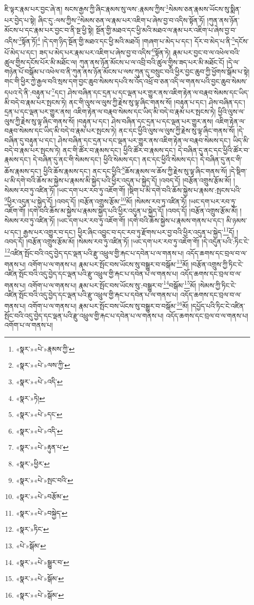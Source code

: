ཇི་ལྟར་རྣམ་པར་བྱང་ཞེ་ན། སངས་རྒྱས་ཀྱི་ཞིང་རྣམས་སུ་ལས་:རྣམས་ཀྱིས་\footnote{«སྣར་»«པེ་»རྣམས་ཀྱི་}སེམས་ཅན་རྣམས་ཡོངས་སུ་སྨིན་པར་བྱེད་པ་སྟེ། ཞིང་དུ་:ལས་ཀྱིས་\footnote{«སྣར་»«པེ་»ལས་ཀྱི་}སེམས་ཅན་ལ་རྣམ་པར་འཇིག་པ་ཞེས་བྱ་བ་འདིས་སྟོན་ཏོ། །ཀུན་ནས་ཉོན་མོངས་པ་དང་རྣམ་པར་བྱང་བ་ནི་སྔ་ཕྱི་སྟེ། སྔོན་གྱི་མཐའ་དང་ཕྱི་མའི་མཐའ་ལ་རྣམ་པར་འཇིག་པ་ཞེས་བྱ་བ་འདིས་\footnote{«སྣར་»«པེ་»འདི་}སྟོན་ཏོ།\footnote{«སྣར་»ཏེ།} །དེ་དག་ཉིད་སྔོན་གྱི་མཐའ་དང་ཕྱི་མའི་མཐའོ། །གཞག་པ་མེད་པ་དང་། དོར་བ་མེད་པ་ནི་\footnote{«སྣར་»«པེ་»དང་}དངོས་པོ་མེད་པ་དང་། ཟད་པ་མེད་པར་རྣམ་པར་འཇིག་པ་ཞེས་བྱ་བ་འདིས་\footnote{«སྣར་»«པེ་»འདི་}སྟོན་ཏེ། རྣམ་པར་བྱང་བ་ལ་འཕེལ་བའི་ཚུལ་གྱིས་དངོས་པོར་མི་མཐོང་ལ། ཀུན་ནས་ཉོན་མོངས་པ་ལ་འབྲི་བའི་ཚུལ་གྱིས་ཟད་པར་མི་མཐོང་ངོ། །དེ་ལ་གཉེན་པོ་བསྒོམ་པ་འཕེལ་བ་ནི་ཀུན་ནས་ཉོན་མོངས་པ་ལས་ཀུན་དུ་བསྲུང་བའི་ཕྱིར་བྱང་ཆུབ་ཀྱི་ཕྱོགས་སྒོམ་པ་སྟེ། གང་གི་ཕྱིར་ཀྱེ་རྒྱལ་བའི་སྲས་དག་བྱང་ཆུབ་སེམས་དཔའི་ས་འོད་འཕྲོ་བ་ཅན་འདི་ལ་གནས་པའི་བྱང་ཆུབ་སེམས་དཔའ་དེ་ནི་:བརྟུན་པ་\footnote{«སྣར་»«པེ་»རྟུན་པ་}དང་། ཤེས་བཞིན་དང་དྲན་པ་དང་ལྡན་པར་གྱུར་ནས་འཇིག་རྟེན་ལ་བརྣབ་སེམས་དང་ཡིད་མི་བདེ་བ་རྣམ་པར་སྤངས་ཏེ། ནང་གི་ལུས་ལ་ལུས་ཀྱི་རྗེས་སུ་ལྟ་ཞིང་གནས་སོ། །བརྟུན་པ་དང་། ཤེས་བཞིན་དང་། དྲན་པ་དང་ལྡན་པར་གྱུར་ནས། འཇིག་རྟེན་ལ་བརྣབ་སེམས་དང་ཡིད་མི་བདེ་བ་རྣམ་པར་སྤངས་ཏེ། ཕྱིའི་ལུས་ལ་ལུས་ཀྱི་རྗེས་སུ་ལྟ་ཞིང་གནས་སོ། །བརྟུན་པ་དང་། ཤེས་བཞིན་དང་དྲན་པ་དང་ལྡན་པར་གྱུར་ནས། འཇིག་རྟེན་ལ་བརྣབ་སེམས་དང་ཡིད་མི་བདེ་བ་རྣམ་པར་སྤངས་ཏེ། ནང་དང་ཕྱིའི་ལུས་ལ་ལུས་ཀྱི་རྗེས་སུ་ལྟ་ཞིང་གནས་སོ། །དེ་བཞིན་དུ་བརྟུན་པ་དང་། ཤེས་བཞིན་དང་དྲན་པ་དང་ལྡན་པར་གྱུར་ནས་འཇིག་རྟེན་ལ་བརྣབ་སེམས་དང་། ཡིད་མི་བདེ་བ་རྣམ་པར་སྤངས་ཏེ། ནང་གི་ཚོར་བ་རྣམས་དང་། ཕྱིའི་ཚོར་བ་རྣམས་དང་། དེ་བཞིན་དུ་ནང་དང་ཕྱིའི་ཚོར་བ་རྣམས་དང་། དེ་བཞིན་དུ་ནང་གི་སེམས་དང་། ཕྱིའི་སེམས་དང་། ནང་དང་ཕྱིའི་སེམས་དང་། དེ་བཞིན་དུ་ནང་གི་ཆོས་རྣམས་དང་། ཕྱིའི་ཆོས་རྣམས་དང་། ནང་དང་ཕྱིའི་\footnote{«སྣར་»ཕྱིར་}ཆོས་རྣམས་ལ་ཆོས་ཀྱི་རྗེས་སུ་ལྟ་ཞིང་གནས་སོ། །དེ་སྡིག་པ་མི་དགེ་བའི་ཆོས་མ་སྐྱེས་པ་རྣམས་མི་སྐྱེད་པའི་ཕྱིར་འདུན་པ་སྐྱེད་དོ། །འབད་དོ། །བརྩོན་འགྲུས་རྩོམ་མོ། །སེམས་རབ་ཏུ་འཛིན་ཏོ། །ཡང་དག་པར་རབ་ཏུ་འཇོག་གོ། །སྡིག་པ་མི་དགེ་བའི་ཆོས་སྐྱེས་པ་རྣམས་:སྤངས་པའི་\footnote{«སྣར་»«པེ་»སྤང་བའི་}ཕྱིར་འདུན་པ་སྐྱེད་དོ། །འབད་དོ། །བརྩོན་འགྲུས་རྩོམ་\footnote{«སྣར་»«པེ་»བརྩོམ་}མོ། །སེམས་རབ་ཏུ་འཛིན་ཏོ། །ཡང་དག་པར་རབ་ཏུ་འཇོག་གོ། །དགེ་བའི་ཆོས་མ་སྐྱེས་པ་རྣམས་སྐྱེད་པའི་ཕྱིར་འདུན་པ་སྐྱེད་དོ། །འབད་དོ། །བརྩོན་འགྲུས་རྩོམ་མོ། །སེམས་རབ་ཏུ་འཛིན་ཏོ། །ཡང་དག་པར་རབ་ཏུ་འཇོག་གོ། །དགེ་བའི་ཆོས་སྐྱེས་པ་རྣམས་གནས་པ་དང་། མི་ཉམས་པ་དང་། རྒྱས་པར་འགྱུར་བ་དང་། ཕྱིར་ཞིང་འབྱུང་བ་དང་རབ་ཏུ་རྫོགས་པར་བྱ་བའི་ཕྱིར་འདུན་པ་སྐྱེད་\footnote{«སྣར་»«པེ་»བསྐྱེད་}དོ། །འབད་དོ། །བརྩོན་འགྲུས་རྩོམ་མོ། །སེམས་རབ་ཏུ་འཛིན་ཏོ། །ཡང་དག་པར་རབ་ཏུ་འཇོག་གོ། །དེ་འདུན་པའི་:ཏིང་ངེ་\footnote{«སྣར་»ཏིང་}འཛིན་སྤོང་བའི་འདུ་བྱེད་དང་ལྡན་པའི་རྫུ་འཕྲུལ་གྱི་རྐང་པ་དབེན་པ་ལ་གནས་པ། འདོད་ཆགས་དང་བྲལ་བ་ལ་གནས་པ། འགོག་པ་ལ་གནས་པ། རྣམ་པར་སྤོང་བས་ཡོངས་སུ་བསྒྱུར་བ་བསྒོམ་\footnote{«པེ་»སྒོམ་}མོ། །བརྩོན་འགྲུས་ཀྱི་ཏིང་ངེ་འཛིན་སྤོང་བའི་འདུ་བྱེད་དང་ལྡན་པའི་རྫུ་འཕྲུལ་གྱི་རྐང་པ་དབེན་པ་ལ་གནས་པ། འདོད་ཆགས་དང་བྲལ་བ་ལ་གནས་པ། འགོག་པ་ལ་གནས་པ། རྣམ་པར་སྤོང་བས་ཡོངས་སུ་:བསྒྱུར་བ་\footnote{«སྣར་»«པེ་»སྒྱུར་བ་}བསྒོམ་\footnote{«སྣར་»«པེ་»སྒོམ་}མོ། །སེམས་ཀྱི་ཏིང་ངེ་འཛིན་སྤོང་བའི་འདུ་བྱེད་དང་ལྡན་པའི་རྫུ་འཕྲུལ་གྱི་རྐང་པ་དབེན་པ་ལ་གནས་པ། འདོད་ཆགས་དང་བྲལ་བ་ལ་གནས་པ། འགོག་པ་ལ་གནས་པ། རྣམ་པར་སྤོང་བས་ཡོངས་སུ་བསྒྱུར་བ་བསྒོམ་\footnote{«སྣར་»«པེ་»སྒོམ་}མོ། །དཔྱོད་པའི་ཏིང་ངེ་འཛིན་སྤོང་བའི་འདུ་བྱེད་དང་ལྡན་པའི་རྫུ་འཕྲུལ་གྱི་རྐང་པ་དབེན་པ་ལ་གནས་པ། འདོད་ཆགས་དང་བྲལ་བ་ལ་གནས་པ། འགོག་པ་ལ་གནས་པ། 